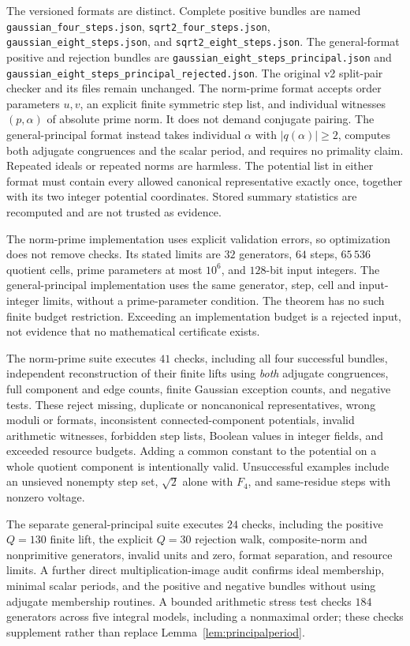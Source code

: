 \documentclass[11pt]{article}
\numberwithin{equation}{section}
\theoremstyle{definition}\newtheorem{definition}[theorem]{Definition}
\theoremstyle{remark}\newtheorem{remark}[theorem]{Remark}
\newcommand{\abs}[1]{\lvert #1\rvert}
\begin{document}
The versioned formats are distinct. Complete positive bundles are named \nolinkurl{gaussian_four_steps.json}, \nolinkurl{sqrt2_four_steps.json}, \nolinkurl{gaussian_eight_steps.json}, and \nolinkurl{sqrt2_eight_steps.json}. The general-format positive and rejection bundles are \nolinkurl{gaussian_eight_steps_principal.json} and \nolinkurl{gaussian_eight_steps_principal_rejected.json}. The original v2 split-pair checker and its files remain unchanged. The norm-prime format accepts order parameters $u,v$, an explicit finite symmetric step list, and individual witnesses $(p,\alpha)$ of absolute prime norm. It does not demand conjugate pairing. The general-principal format instead takes individual $\alpha$ with $\abs{q(\alpha)}\ge2$, computes both adjugate congruences and the scalar period, and requires no primality claim. Repeated ideals or repeated norms are harmless. The potential list in either format must contain every allowed canonical representative exactly once, together with its two integer potential coordinates. Stored summary statistics are recomputed and are not trusted as evidence.

The norm-prime implementation uses explicit validation errors, so optimization does not remove checks. Its stated limits are $32$ generators, $64$ steps, $65\,536$ quotient cells, prime parameters at most $10^6$, and $128$-bit input integers. The general-principal implementation uses the same generator, step, cell and input-integer limits, without a prime-parameter condition. The theorem has no such finite budget restriction. Exceeding an implementation budget is a rejected input, not evidence that no mathematical certificate exists.

The norm-prime suite executes $41$ checks, including all four successful bundles, independent reconstruction of their finite lifts using \emph{both} adjugate congruences, full component and edge counts, finite Gaussian exception counts, and negative tests. These reject missing, duplicate or noncanonical representatives, wrong moduli or formats, inconsistent connected-component potentials, invalid arithmetic witnesses, forbidden step lists, Boolean values in integer fields, and exceeded resource budgets. Adding a common constant to the potential on a whole quotient component is intentionally valid. Unsuccessful examples include an unsieved nonempty step set, $\sqrt2$ alone with $F_4$, and same-residue steps with nonzero voltage.

The separate general-principal suite executes $24$ checks, including the positive $Q=130$ finite lift, the explicit $Q=30$ rejection walk, composite-norm and nonprimitive generators, invalid units and zero, format separation, and resource limits. A further direct multiplication-image audit confirms ideal membership, minimal scalar periods, and the positive and negative bundles without using adjugate membership routines. A bounded arithmetic stress test checks $184$ generators across five integral models, including a nonmaximal order; these checks supplement rather than replace Lemma~\ref{lem:principalperiod}.
\end{document}
